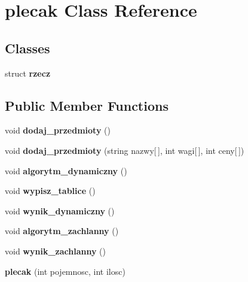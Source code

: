 \hypertarget{classplecak}{\section{plecak \-Class \-Reference}
\label{classplecak}
}
\subsection*{\-Classes}
\begin{DoxyCompactItemize}
\item 
struct {\bfseries rzecz}
\end{DoxyCompactItemize}
\subsection*{\-Public \-Member \-Functions}
\begin{DoxyCompactItemize}
\item 
\hypertarget{classplecak_aea1ff6cd79ec3e3108d40fca86242138}{void {\bfseries dodaj\-\_\-przedmioty} ()}\label{classplecak_aea1ff6cd79ec3e3108d40fca86242138}

\item 
\hypertarget{classplecak_a3e8d39b030a84f2cb2a335369bce2eee}{void {\bfseries dodaj\-\_\-przedmioty} (string nazwy\mbox{[}$\,$\mbox{]}, int wagi\mbox{[}$\,$\mbox{]}, int ceny\mbox{[}$\,$\mbox{]})}\label{classplecak_a3e8d39b030a84f2cb2a335369bce2eee}

\item 
\hypertarget{classplecak_aa1745a766507f7dd06dbc9f407a796ae}{void {\bfseries algorytm\-\_\-dynamiczny} ()}\label{classplecak_aa1745a766507f7dd06dbc9f407a796ae}

\item 
\hypertarget{classplecak_a3dfdca773ed5c3fe4e719ef246807bd7}{void {\bfseries wypisz\-\_\-tablice} ()}\label{classplecak_a3dfdca773ed5c3fe4e719ef246807bd7}

\item 
\hypertarget{classplecak_a0e0d7795b6e9c78e3dbb637ca3ebc15e}{void {\bfseries wynik\-\_\-dynamiczny} ()}\label{classplecak_a0e0d7795b6e9c78e3dbb637ca3ebc15e}

\item 
\hypertarget{classplecak_a6b4bf5d17a513649f6f2dfff890dea42}{void {\bfseries algorytm\-\_\-zachlanny} ()}\label{classplecak_a6b4bf5d17a513649f6f2dfff890dea42}

\item 
\hypertarget{classplecak_ab816fbb925126e8981b3b9f1943cd74d}{void {\bfseries wynik\-\_\-zachlanny} ()}\label{classplecak_ab816fbb925126e8981b3b9f1943cd74d}

\item 
\hypertarget{classplecak_a0d4bcbfc1bdca24de78152198e6ee3f7}{{\bfseries plecak} (int pojemnosc, int ilosc)}\label{classplecak_a0d4bcbfc1bdca24de78152198e6ee3f7}

\end{DoxyCompactItemize}


